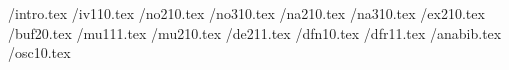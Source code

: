  \topdir/intro.tex
 \topdir/iv110.tex
 \topdir/no210.tex
 \topdir/no310.tex
 \topdir/na210.tex
 \topdir/na310.tex
 \topdir/ex210.tex
 \topdir/buf20.tex
 \topdir/mu111.tex
 \topdir/mu210.tex
 \topdir/de211.tex
 \topdir/dfn10.tex
 \topdir/dfr11.tex
 \topdir/anabib.tex
 \topdir/osc10.tex

\newpage
\noindent\makebox[\textwidth]{\hrulefill}
\tableofcontents
\vspace*{3ex}
\noindent\makebox[\textwidth]{\hrulefill}
\newpage

